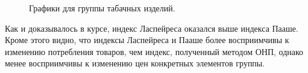 \documentclass[10pt, a4paper]{article}
\begin{document}
\begin{figure}[H]
\centering{}
\caption{Графики для группы табачных изделий.}
\end{figure}

Как и доказывалось в курсе, индекс Ласпейреса оказался выше индекса Пааше. Кроме этого видно, что индексы Ласпейреса и Пааше более восприимчивы к изменению потребления товаров, чем индекс, полученный методом ОНП, однако менее восприимчивы к изменению цен конкретных элементов группы. 
\end{document}
